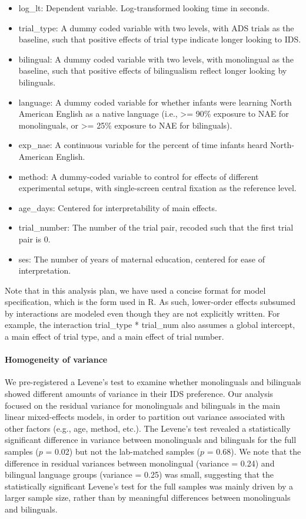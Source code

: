 \documentclass[,man,floatsintext]{apa6}
\providecommand{\tightlist}{%
  \setlength{\itemsep}{0pt}\setlength{\parskip}{0pt}}
\let\oldparagraph\paragraph
\renewcommand{\paragraph}[1]{\oldparagraph{#1}\mbox{}}
\begin{document}
\begin{itemize}
\tightlist
\item
  log\_lt: Dependent variable. Log-transformed looking time in seconds.
\item
  trial\_type: A dummy coded variable with two levels, with ADS trials as the baseline, such that positive effects of trial type indicate longer looking to IDS.
\item
  bilingual: A dummy coded variable with two levels, with monolingual as the baseline, such that positive effects of bilingualism reflect longer looking by bilinguals.
\item
  language: A dummy coded variable for whether infants were learning North American English as a native language (i.e., \textgreater{}= 90\% exposure to NAE for monolinguals, or \textgreater{}= 25\% exposure to NAE for bilinguals).
\item
  exp\_nae: A continuous variable for the percent of time infants heard North-American English.
\item
  method: A dummy-coded variable to control for effects of different experimental setups, with single-screen central fixation as the reference level.
\item
  age\_days: Centered for interpretability of main effects.
\item
  trial\_number: The number of the trial pair, recoded such that the first trial pair is 0.
\item
  ses: The number of years of maternal education, centered for ease of interpretation.
\end{itemize}

Note that in this analysis plan, we have used a concise format for model specification, which is the form used in R. As such, lower-order effects subsumed by interactions are modeled even though they are not explicitly written. For example, the interaction trial\_type * trial\_num also assumes a global intercept, a main effect of trial type, and a main effect of trial number.

\hypertarget{homogeneity-of-variance}{%
\paragraph{Homogeneity of variance}\label{homogeneity-of-variance}}

We pre-registered a Levene's test to examine whether monolinguals and bilinguals showed different amounts of variance in their IDS preference. Our analysis focused on the residual variance for monolinguals and bilinguals in the main linear mixed-effects models, in order to partition out variance associated with other factors (e.g., age, method, etc.). The Levene's test revealed a statistically significant difference in variance between monolinguals and bilinguals for the full samples (\(p\) = 0.02) but not the lab-matched samples (\(p\) = 0.68). We note that the difference in residual variances between monolingual (variance = 0.24) and bilingual language groups (variance = 0.25) was small, suggesting that the statistically significant Levene's test for the full samples was mainly driven by a larger sample size, rather than by meaningful differences between monolinguals and bilinguals.
\end{document}

